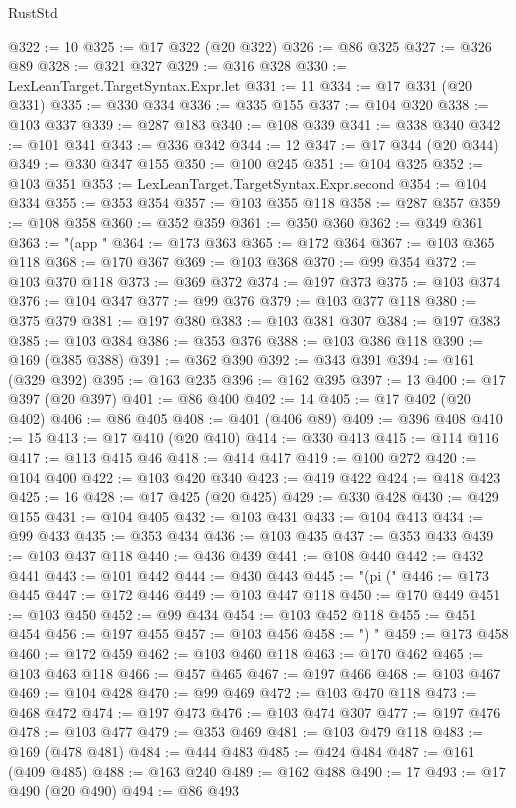 \begin{lexlean}{RustStd}
\begin{coremodule}
@322 := 10
@325 := @17 @322 (@20 @322)
@326 := @86 @325
@327 := @326 @89
@328 := @321 @327
@329 := @316 @328
@330 := LexLeanTarget.TargetSyntax.Expr.let
@331 := 11
@334 := @17 @331 (@20 @331)
@335 := @330 @334
@336 := @335 @155
@337 := @104 @320
@338 := @103 @337
@339 := @287 @183
@340 := @108 @339
@341 := @338 @340
@342 := @101 @341
@343 := @336 @342
@344 := 12
@347 := @17 @344 (@20 @344)
@349 := @330 @347 @155
@350 := @100 @245
@351 := @104 @325
@352 := @103 @351
@353 := LexLeanTarget.TargetSyntax.Expr.second
@354 := @104 @334
@355 := @353 @354
@357 := @103 @355 @118
@358 := @287 @357
@359 := @108 @358
@360 := @352 @359
@361 := @350 @360
@362 := @349 @361
@363 := "(app "
@364 := @173 @363
@365 := @172 @364
@367 := @103 @365 @118
@368 := @170 @367
@369 := @103 @368
@370 := @99 @354
@372 := @103 @370 @118
@373 := @369 @372
@374 := @197 @373
@375 := @103 @374
@376 := @104 @347
@377 := @99 @376
@379 := @103 @377 @118
@380 := @375 @379
@381 := @197 @380
@383 := @103 @381 @307
@384 := @197 @383
@385 := @103 @384
@386 := @353 @376
@388 := @103 @386 @118
@390 := @169 (@385 @388)
@391 := @362 @390
@392 := @343 @391
@394 := @161 (@329 @392)
@395 := @163 @235
@396 := @162 @395
@397 := 13
@400 := @17 @397 (@20 @397)
@401 := @86 @400
@402 := 14
@405 := @17 @402 (@20 @402)
@406 := @86 @405
@408 := @401 (@406 @89)
@409 := @396 @408
@410 := 15
@413 := @17 @410 (@20 @410)
@414 := @330 @413
@415 := @114 @116
@417 := @113 @415 @46
@418 := @414 @417
@419 := @100 @272
@420 := @104 @400
@422 := @103 @420 @340
@423 := @419 @422
@424 := @418 @423
@425 := 16
@428 := @17 @425 (@20 @425)
@429 := @330 @428
@430 := @429 @155
@431 := @104 @405
@432 := @103 @431
@433 := @104 @413
@434 := @99 @433
@435 := @353 @434
@436 := @103 @435
@437 := @353 @433
@439 := @103 @437 @118
@440 := @436 @439
@441 := @108 @440
@442 := @432 @441
@443 := @101 @442
@444 := @430 @443
@445 := "(pi ("
@446 := @173 @445
@447 := @172 @446
@449 := @103 @447 @118
@450 := @170 @449
@451 := @103 @450
@452 := @99 @434
@454 := @103 @452 @118
@455 := @451 @454
@456 := @197 @455
@457 := @103 @456
@458 := ") "
@459 := @173 @458
@460 := @172 @459
@462 := @103 @460 @118
@463 := @170 @462
@465 := @103 @463 @118
@466 := @457 @465
@467 := @197 @466
@468 := @103 @467
@469 := @104 @428
@470 := @99 @469
@472 := @103 @470 @118
@473 := @468 @472
@474 := @197 @473
@476 := @103 @474 @307
@477 := @197 @476
@478 := @103 @477
@479 := @353 @469
@481 := @103 @479 @118
@483 := @169 (@478 @481)
@484 := @444 @483
@485 := @424 @484
@487 := @161 (@409 @485)
@488 := @163 @240
@489 := @162 @488
@490 := 17
@493 := @17 @490 (@20 @490)
@494 := @86 @493

\end{coremodule}
\end{lexlean}
